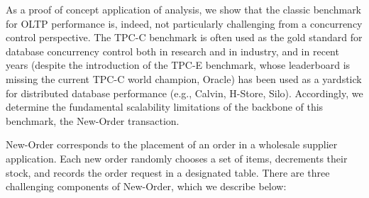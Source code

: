 As a proof of concept application of \cfreedom analysis, we show that
the classic benchmark for OLTP performance is, indeed, not
particularly challenging from a concurrency control perspective. The
TPC-C benchmark is often used as the gold standard for database
concurrency control both in research and in industry, and in recent
years (despite the introduction of the TPC-E benchmark, whose
leaderboard is missing the current TPC-C world champion, Oracle) has
been used as a yardstick for distributed database performance (e.g.,
Calvin, H-Store, Silo). Accordingly, we determine the fundamental
scalability limitations of the backbone of this benchmark, the
New-Order transaction.

New-Order corresponds to the placement of an order in a wholesale
supplier application. Each new order randomly chooses a set of items,
decrements their stock, and records the order request in a designated
table. There are three challenging components of New-Order, which we
describe below:
